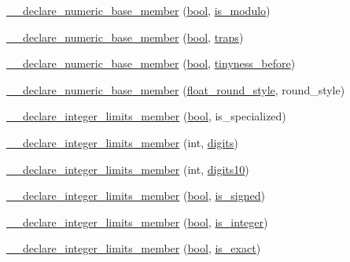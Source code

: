 \begin{DoxyCompactItemize}
\item 
\hyperlink{limits-hack_8h_a8a84faa55910782c1b9c41d6129bbf02}{\+\_\+\+\_\+declare\+\_\+numeric\+\_\+base\+\_\+member} (\hyperlink{compiler_8h_abb452686968e48b67397da5f97445f5b}{bool}, \hyperlink{numinquire_8h_a7fda08f95601cec6a8b3588a5fd0c333}{is\+\_\+modulo})
\item 
\hyperlink{limits-hack_8h_aa4a2fe575eebd1f64fb22959ae8fe528}{\+\_\+\+\_\+declare\+\_\+numeric\+\_\+base\+\_\+member} (\hyperlink{compiler_8h_abb452686968e48b67397da5f97445f5b}{bool}, \hyperlink{numinquire_8h_af19e27df7997796fb35f917210365468}{traps})
\item 
\hyperlink{limits-hack_8h_a6892fafde1ffb71b661c3b4f9c4c1ebe}{\+\_\+\+\_\+declare\+\_\+numeric\+\_\+base\+\_\+member} (\hyperlink{compiler_8h_abb452686968e48b67397da5f97445f5b}{bool}, \hyperlink{numinquire_8h_ab169ea37b4fe51cb2aa0f04515c1aa04}{tinyness\+\_\+before})
\item 
\hyperlink{limits-hack_8h_ace8749ebd07b9ab4b2cab0d80e46657b}{\+\_\+\+\_\+declare\+\_\+numeric\+\_\+base\+\_\+member} (\hyperlink{limits-hack_8h_a3bdaf6c7e8a65859bf550443989c5a66}{float\+\_\+round\+\_\+style}, round\+\_\+style)
\item 
\hyperlink{limits-hack_8h_af809adc3c0073854e2552d96fb882c0a}{\+\_\+\+\_\+declare\+\_\+integer\+\_\+limits\+\_\+member} (\hyperlink{compiler_8h_abb452686968e48b67397da5f97445f5b}{bool}, is\+\_\+specialized)
\item 
\hyperlink{limits-hack_8h_a57061ff354670c97608f4884209174eb}{\+\_\+\+\_\+declare\+\_\+integer\+\_\+limits\+\_\+member} (int, \hyperlink{numinquire_8h_a76a0faf7aefa53527cce92a7a96d8e07}{digits})
\item 
\hyperlink{limits-hack_8h_aea6f6e023668035bd65400f9d4e3c251}{\+\_\+\+\_\+declare\+\_\+integer\+\_\+limits\+\_\+member} (int, \hyperlink{numinquire_8h_aba621087a8b1529462d180fa6cac4a5d}{digits10})
\item 
\hyperlink{limits-hack_8h_a57851efc095a7a776ffe114e1a3b8350}{\+\_\+\+\_\+declare\+\_\+integer\+\_\+limits\+\_\+member} (\hyperlink{compiler_8h_abb452686968e48b67397da5f97445f5b}{bool}, \hyperlink{numinquire_8h_ae60c5a6ee78f454551ef8a312fb9479c}{is\+\_\+signed})
\item 
\hyperlink{limits-hack_8h_aedc35532eface0b4c5515a857b06d660}{\+\_\+\+\_\+declare\+\_\+integer\+\_\+limits\+\_\+member} (\hyperlink{compiler_8h_abb452686968e48b67397da5f97445f5b}{bool}, \hyperlink{numinquire_8h_aec09c316d35c523e356e6d34e7f974b6}{is\+\_\+integer})
\item 
\hyperlink{limits-hack_8h_a7f507ba4c6a349780390d8e9536aeb86}{\+\_\+\+\_\+declare\+\_\+integer\+\_\+limits\+\_\+member} (\hyperlink{compiler_8h_abb452686968e48b67397da5f97445f5b}{bool}, \hyperlink{numinquire_8h_a1afdd1269713b8a31cc3cf4558097888}{is\+\_\+exact})

\end{DoxyCompactItemize}
